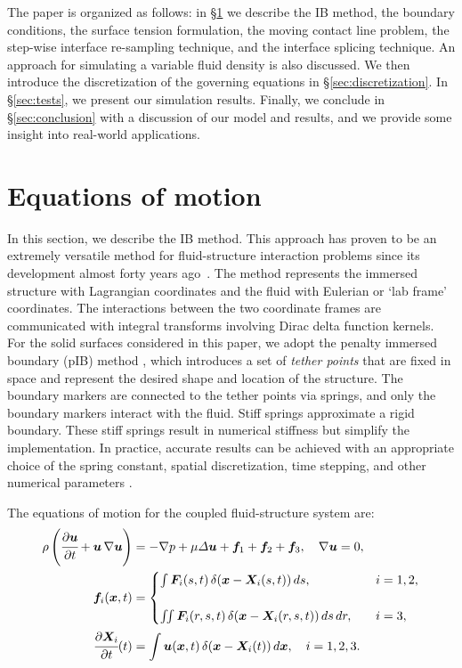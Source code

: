 \documentclass{jfm}
\begin{document}
The paper is organized as follows: in \S\ref{sec:numerical} we describe the IB method, the boundary conditions, the surface tension formulation, the moving contact line problem, the step-wise interface re-sampling technique, and the interface splicing technique. An approach for simulating a variable fluid density is also discussed. We then introduce the discretization of the governing equations in \S\ref{sec:discretization}. In \S\ref{sec:tests}, we present our simulation results. Finally, we conclude in \S\ref{sec:conclusion} with a discussion of our model and results, and we provide some insight into real-world applications.

\section{Equations of motion} \label{sec:numerical}
In this section, we describe the IB method. This approach has proven to be an extremely versatile method for fluid-structure interaction problems since its development almost forty years ago~\citep{peskin1972flow,mcqueen1997shared,arthurs1998modeling,lai2000immersed,griffith2009simulating,balboa2011staggered,devendran2012immersed,sanaei2021flight}. The method represents the immersed structure with Lagrangian coordinates and the fluid with Eulerian or `lab frame' coordinates. The interactions between the two coordinate frames are communicated with integral transforms involving Dirac delta function kernels. For the solid surfaces considered in this paper, we adopt the penalty immersed boundary (pIB) method \citep{kim2016penalty}, which introduces a set of \textit{tether points} that are fixed in space and represent the desired shape and location of the structure. The boundary markers are connected to the tether points via springs, and only the boundary markers interact with the fluid. Stiff springs approximate a rigid boundary. These stiff springs result in numerical stiffness but simplify the implementation. In practice, accurate results can be achieved with an appropriate choice of the spring constant, spatial discretization, time stepping, and other numerical parameters \citep{kim2016penalty}. 

The equations of motion for the coupled fluid-structure system are:
\begin{align}
\rho\left(\cfrac{\partial\bm{u}}{\partial t}+\bm{u}\,\nabla\bm{u}\right) & =
    -\nabla p+\mu\varDelta\bm{u}+\bm{f}_1+\bm{f}_2+\bm{f}_3,
    \quad
    \nabla \bm{u}=0, \label{eq:ib-ns} \\
\bm{f}_i(\bm{x},t) & = 
    \begin{cases}
    \int  \bm{F}_i(   s,t)\,\delta(\bm{x}-\bm{X}_i(   s,t))\,ds,     \quad &i = 1,2, \\ \\
    \iint \bm{F}_i(r, s,t)\,\delta(\bm{x}-\bm{X}_i(r, s,t))\,ds\,dr, \quad &i = 3, 
    \end{cases}
    \label{eq:ib-spread-force} \\
\cfrac{\partial\bm{X}_i}{\partial t}(t) &=
    \int\bm{u}(\bm{x},t)\,\delta(\bm{x}-\bm{X}_i(t)) \, d\bm{x}, \quad i = 1,2,3.
    \label{eq:ib-advect}
\end{align}
\end{document}
